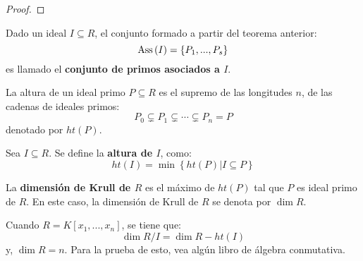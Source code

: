 \documentclass[12pt]{report}
\newcounter{it}
\theoremstyle{largebreak}
\newcommand{\Ass}[1]{\ensuremath{\textup{Ass}\left(#1\right)}}
\begin{document}
    \begin{proof}
        
    \end{proof}

    \begin{mydef}
        Dado un ideal $I\subseteq R$, el conjunto formado a partir del teorema anterior:
        \begin{equation*}
            \Ass{I}=\left\{P_1,...,P_s \right\}
        \end{equation*}
        es llamado el \textbf{conjunto de primos asociados a $I$}.
    \end{mydef}

    \begin{mydef}
        La altura de un ideal primo $P\subseteq R$ es el supremo de las longitudes $n$, de las cadenas de ideales primos:
        \begin{equation*}
            P_0\subsetneq P_1\subsetneq\cdots\subsetneq P_n=P
        \end{equation*}
        denotado por $ht(P)$.
    \end{mydef}

    \begin{mydef}
        Sea $I\subseteq R$. Se define la \textbf{altura de $I$}, como:
        \begin{equation*}
            ht(I)=\min\left\{ht(P)\Big|I\subseteq P \right\}
        \end{equation*}
    \end{mydef}

    \begin{mydef}
        La \textbf{dimensión de Krull de $R$} es el máximo de $ht(P)$ tal que $P$ es ideal primo de $R$. En este caso, la dimensión de Krull de $R$ se denota por $\dim R$.
    \end{mydef}

    Cuando $R=K[x_1,...,x_n]$, se tiene que:
    \begin{equation*}
        \dim R/I=\dim R-ht(I)
    \end{equation*}
    y, $\dim R=n$. Para la prueba de esto, vea algún libro de álgebra conmutativa.
\end{document}
